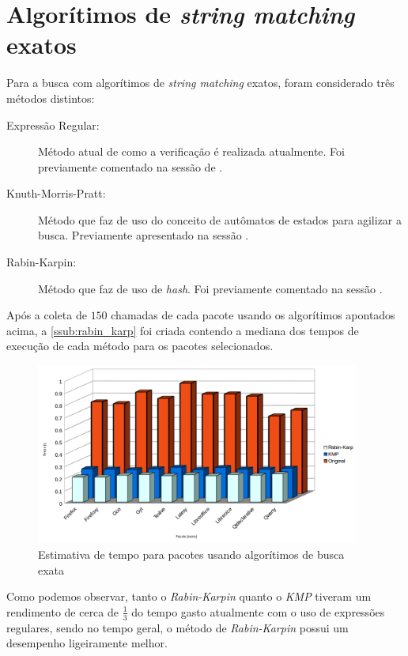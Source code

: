
\section{Algorítimos de \textit{string matching} exatos} %
\label{sec:algor_timos_de_string_matching_exatos}

Para a busca com algorítimos de \textit{string matching} exatos, foram considerado três métodos distintos:

\begin{description}
	\item[Expressão Regular:] Método atual de como a verificação é realizada atualmente. Foi previamente comentado na sessão de .
	\item[Knuth-Morris-Pratt:] Método que faz de uso do conceito de autômatos de estados para agilizar a busca. Previamente apresentado na sessão .
	\item[Rabin-Karpin:]  Método que faz de uso de \textit{hash}. Foi previamente comentado na sessão .
\end{description}

Após a coleta de $150$ chamadas de cada pacote usando os algorítimos apontados acima, a \autoref{ssub:rabin_karp} foi criada contendo a mediana dos tempos de execução de cada método para os pacotes selecionados.

\begin{figure}[htbp]
  \centering
  \includegraphics[width=0.95\textwidth]{figuras/tempo-rk_kmp_std}
  \caption{Estimativa de tempo para pacotes usando algorítimos de busca exata}
  \label{tempo_rk_kmp_std}
\end{figure}

Como podemos observar, tanto o \textit{Rabin-Karpin} quanto o \textit{KMP} tiveram um rendimento de cerca de $\frac{1}{3}$ do tempo gasto atualmente com o uso de expressões regulares, sendo no tempo geral, o método de \textit{Rabin-Karpin} possui um desempenho ligeiramente melhor.



